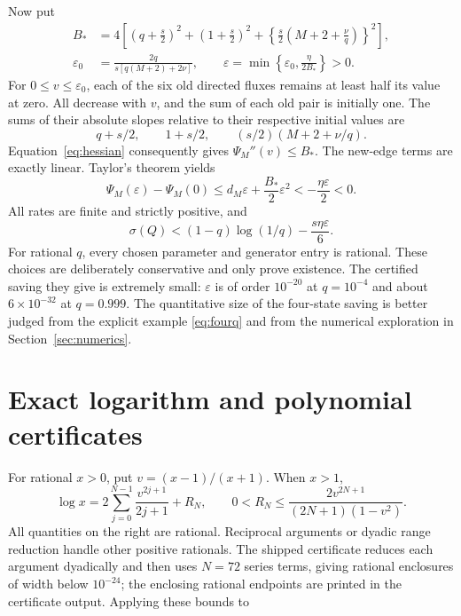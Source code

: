 \documentclass[11pt,a4paper]{article}
\theoremstyle{remark}\newtheorem{remark}[theorem]{Remark}
\begin{document}
Now put
\begin{align}
 B_*&=4\left[
       \left(q+\frac s2\right)^2+
       \left(1+\frac s2\right)^2+
       \left\{\frac s2\left(M+2+\frac \nu q\right)\right\}^2
       \right],\nonumber\\
 \varepsilon_0&=\frac{2q}{s[q(M+2)+2\nu ]},\qquad
 \varepsilon=\min\left\{\varepsilon_0,\frac{\eta}{2B_*}\right\}>0.
\end{align}
For $0\leq v\leq\varepsilon_0$, each of the six old directed fluxes
remains at least half its value at zero. All decrease with $v$, and the
sum of each old pair is initially one. The sums of their absolute slopes
relative to their respective initial values are
\begin{equation}
 q+s/2,\qquad 1+s/2,\qquad (s/2)(M+2+\nu /q).
\end{equation}
Equation~\eqref{eq:hessian} consequently gives
$\Psi_M''(v)\leq B_*$. The new-edge terms are exactly linear.
Taylor's theorem yields
\begin{equation}
 \Psi_M(\varepsilon)-\Psi_M(0)
 \leq d_M\varepsilon+\frac{B_*}{2}\varepsilon^2
 <-\frac{\eta\varepsilon}{2}<0.
\end{equation}
All rates are finite and strictly positive, and
\begin{equation}
 \sigma(Q)<(1-q)\log(1/q)-\frac{s\eta\varepsilon}{6}.
\end{equation}
For rational $q$, every chosen parameter and generator entry is rational.
These choices are deliberately conservative and only prove existence. The
certified saving they give is extremely small: $\varepsilon$ is of order
$10^{-20}$ at $q=10^{-4}$ and about $6\times10^{-32}$ at $q=0.999$. The quantitative
size of the four-state saving is better judged from the explicit example
\eqref{eq:fourq} and from the numerical exploration in
Section~\ref{sec:numerics}.


\section{Exact logarithm and polynomial certificates}
\label{app:certificate}

For rational $x>0$, put $v=(x-1)/(x+1)$. When $x>1$,
\begin{equation}\label{eq:logseries}
 \log x=2\sum_{j=0}^{N-1}\frac{v^{2j+1}}{2j+1}+R_N,
 \qquad
 0<R_N\leq\frac{2v^{2N+1}}{(2N+1)(1-v^2)}.
\end{equation}
All quantities on the right are rational. Reciprocal arguments or dyadic
range reduction handle other positive rationals. The shipped certificate
reduces each argument dyadically and then uses $N=72$ series terms, giving
rational enclosures of width below $10^{-24}$; the enclosing rational
endpoints are printed in the certificate output. Applying these bounds to
\end{document}
